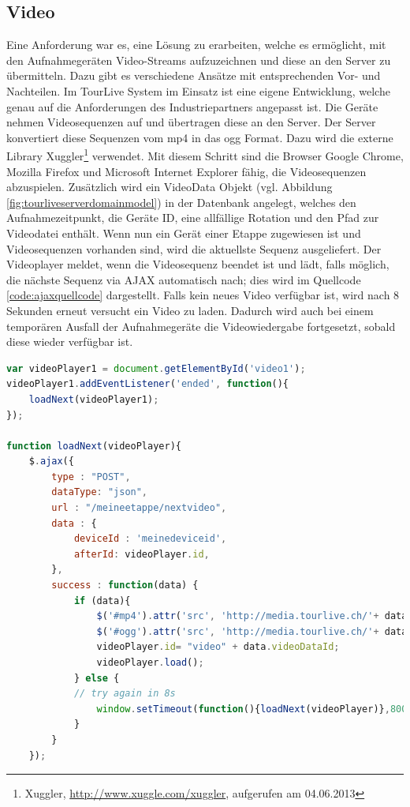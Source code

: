 \subsection{Video}
Eine Anforderung war es, eine Lösung zu erarbeiten, welche es ermöglicht, mit den Aufnahmegeräten Video-Streams aufzuzeichnen und diese an den Server zu übermitteln. Dazu gibt es verschiedene Ansätze mit entsprechenden Vor- und Nachteilen. Im TourLive System im Einsatz ist eine eigene Entwicklung, welche genau auf die Anforderungen des Industriepartners angepasst ist. Die Geräte nehmen Videosequenzen auf und übertragen diese an den Server. Der Server konvertiert diese Sequenzen vom mp4 in das ogg Format. Dazu wird die externe Library Xuggler\footnote{Xuggler, \url{http://www.xuggle.com/xuggler}, aufgerufen am 04.06.2013} verwendet. Mit diesem Schritt sind die Browser Google Chrome, Mozilla Firefox und Microsoft Internet Explorer fähig, die Videosequenzen abzuspielen. Zusätzlich wird ein VideoData Objekt (vgl. Abbildung \ref{fig:tourliveserverdomainmodel}) in der Datenbank angelegt, welches den Aufnahmezeitpunkt, die Geräte ID, eine allfällige Rotation und den Pfad zur Videodatei enthält. Wenn nun ein Gerät einer Etappe zugewiesen ist und Videosequenzen vorhanden sind, wird die aktuellste Sequenz ausgeliefert. Der Videoplayer meldet, wenn die Videosequenz beendet ist und lädt, falls möglich, die nächste Sequenz via AJAX automatisch nach; dies wird im Quellcode \ref{code:ajaxquellcode} dargestellt. Falls kein neues Video verfügbar ist, wird nach 8 Sekunden erneut versucht ein Video zu laden. Dadurch wird auch bei einem temporären Ausfall der Aufnahmegeräte die Videowiedergabe fortgesetzt, sobald diese wieder verfügbar ist.

\begin{lstlisting}[language=JavaScript, caption=Automatisches Nachladen von Videosequenzen, label=code:ajaxquellcode]
var videoPlayer1 = document.getElementById('video1');
videoPlayer1.addEventListener('ended', function(){
	loadNext(videoPlayer1);
});

function loadNext(videoPlayer){
	$.ajax({
		type : "POST",
		dataType: "json",
		url : "/meineetappe/nextvideo",
		data : {
			deviceId : 'meinedeviceid',
			afterId: videoPlayer.id,
		},
		success : function(data) {
			if (data){
				$('#mp4').attr('src', 'http://media.tourlive.ch/'+ data.videoLocation + '.mp4');
				$('#ogg').attr('src', 'http://media.tourlive.ch/'+ data.videoLocation + '.ogg');
				videoPlayer.id= "video" + data.videoDataId;
				videoPlayer.load();
			} else {
			// try again in 8s
				window.setTimeout(function(){loadNext(videoPlayer)},8000);
			}
		}
	});
\end{lstlisting}

